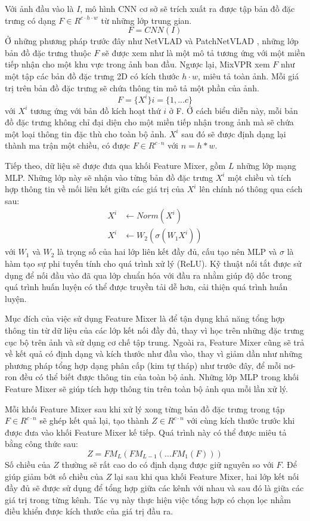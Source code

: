 Với ảnh đầu vào là $I$, mô hình CNN cơ sở sẽ trích xuất ra được tập bản đồ đặc trưng có dạng $F \in R^{c \cdot h \cdot w}$ từ những lớp trung gian.
$$
  F = CNN(I)
$$
Ở những phương pháp trước đây như NetVLAD \cite{arandjelovic2016netvlad} và PatchNetVLAD \cite{hausler2021patchnetvlad}, những lớp bản đồ đặc trưng thuộc $F$ sẽ được xem như là một mô tả tương ứng với một miền tiếp nhận cho một khu vực trong ảnh ban đầu. Ngược lại, MixVPR xem $F$ như một tập các bản đồ đặc trưng 2D có kích thước $h \cdot w$, miêu tả toàn ảnh. Mỗi giá trị trên bản đồ đặc trưng sẽ chứa thông tin mô tả một phần của ảnh.
$$
  F = \{X^{i}\}    i = \{1,...c\}
$$
với $X^{i}$ tương ứng với bản đồ kích hoạt thứ $i$ ở F. Ở cách biểu diễn này, mỗi bản đồ đặc trưng không chỉ đại diện cho một miền tiếp nhận trong ảnh mà sẽ chứa một loại thông tin đặc thù cho toàn bộ ảnh. $X^{i}$ sau đó sẽ được định dạng lại thành ma trận một chiều, có được $F \in R^{c \cdot n}$ với $n = h*w$.

Tiếp theo, dữ liệu sẽ được đưa qua khối Feature Mixer, gồm $L$ những lớp mạng MLP. Những lớp này sẽ nhận vào từng bản đồ đặc trưng $X^{i}$ một chiều và tích hợp thông tin về mối liên kết giữa các giá trị của $X^{i}$ lên chính nó thông qua cách sau:
$$
  \begin{aligned}
    X^{i} & \leftarrow Norm(X^{i})            \\
    X^{i} & \leftarrow W_2(\sigma(W_1 X^{i}))
  \end{aligned}
$$
với $W_1$ và $W_2$ là trọng số của hai lớp liên kết đầy đủ, cấu tạo nên MLP và $\sigma$ là hàm tạo sự phi tuyến tính cho quá trình xử lý (ReLU). Kỹ thuật nối tắt được sử dụng để nối đầu vào đã qua lớp chuẩn hóa với đầu ra nhằm giúp độ dốc trong quá trình huấn luyện có thể được truyền tải dễ hơn, cải thiện quá trình huấn luyện.

Mục đích của việc sử dụng Feature Mixer là để tận dụng khả năng tổng hợp thông tin từ dữ liệu của các lớp kết nối đầy đủ, thay vì học trên những đặc trưng cục bộ trên ảnh và sử dụng cơ chế tập trung. Ngoài ra, Feature Mixer cũng sẽ trả về kết quả có định dạng và kích thước như đầu vào, thay vì giảm dần như những phương pháp tổng hợp dạng phân cấp (kim tự tháp) như trước đây, để mỗi nơ-ron đều có thể biết được thông tin của toàn bộ ảnh. Những lớp MLP trong khối Feature Mixer sẽ giúp tích hợp thông tin trên toàn bộ ảnh qua mỗi lần xử lý.

Mỗi khối Feature Mixer sau khi xử lý xong từng bản đồ đặc trưng trong tập $F \in R^{c \cdot n}$ sẽ ghép kết quả lại, tạo thành $Z \in R^{c \cdot n}$ với cùng kích thước trước khi được đưa vào khối Feature Mixer kế tiếp. Quá trình này có thể được miêu tả bằng công thức sau:
$$
  Z = FM_L(FM_{L-1}(\dots FM_1(F)))
$$
Số chiều của $Z$ thường sẽ rất cao do có định dạng được giữ nguyên so với $F$. Để giúp giảm bớt số chiều của $Z$ lại sau khi qua khối Feature Mixer, hai lớp kết nối đầy đủ sẽ được sử dụng để tổng hợp giữa các kênh với nhau và sau đó là giữa các giá trị trong từng kênh. Tác vụ này thực hiện việc tổng hợp có chọn lọc nhằm điều khiển được kích thước của giá trị đầu ra.

